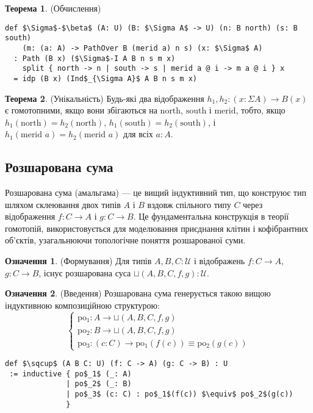 \documentclass{article}
\theoremstyle{definition}
\newtheorem{theorem}{Теорема}
\newtheorem{definition}{Означення}
\begin{document}
\begin{theorem} (Обчислення)
\begin{lstlisting}[mathescape=true]
def $\Sigma$-$\beta$ (A: U) (B: $\Sigma A$ -> U) (n: B north) (s: B south)
    (m: (a: A) -> PathOver B (merid a) n s) (x: $\Sigma$ A)
  : Path (B x) ($\Sigma$-I A B n s m x)
    split { north -> n | south -> s | merid a @ i -> m a @ i } x
  = idp (B x) (Ind$_{\Sigma A}$ A B n s m x)
\end{lstlisting}
\end{theorem}

\begin{theorem} (Унікальність)
Будь-які два відображення \( h_1, h_2 : (x : \Sigma A) \to B(x) \) є гомотопними, якщо вони збігаються
на \( \text{north} \), \( \text{south} \) і \( \text{merid} \), тобто,
якщо \( h_1(\text{north}) = h_2(\text{north}) \), \( h_1(\text{south}) = h_2(\text{south}) \),
і \( h_1(\text{merid } a) = h_2(\text{merid } a) \) для всіх \( a : A \).
\end{theorem}

\subsection{Розшарована сума}
Розшарована сума (амальгама) — це вищий індуктивний тип, що конструює тип шляхом
склеювання двох типів \( A \) і \( B \) вздовж спільного типу \( C \) через відображення \( f : C \to A \)
і \( g : C \to B \). Це фундаментальна конструкція в теорії гомотопій,
використовується для моделювання приєднання клітин і кофібрантних об’єктів, узагальнюючи
топологічне поняття розшарованої суми.

\begin{definition} (Формування)
Для типів \( A, B, C : \mathcal{U} \) і відображень \( f : C \to A \), \( g : C \to B \),
існує розшарована суса \( \sqcup(A,B,C,f,g) : \mathcal{U} \).
\end{definition}

\begin{definition} (Введення)
Розшарована сума генерується такою вищою індуктивною композиційною структурою:
\[
\begin{cases}
\text{po$_1$} : A \to \sqcup(A,B,C,f,g) \\
\text{po$_2$} : B \to \sqcup(A,B,C,f,g) \\
\text{po$_3$} : (c : C) \to \text{po$_1$}(f(c)) \equiv \text{po$_2$}(g(c))
\end{cases}
\]
\begin{lstlisting}[mathescape=true]
def $\sqcup$ (A B C: U) (f: C -> A) (g: C -> B) : U
 := inductive { po$_1$ (_: A)
              | po$_2$ (_: B)
              | po$_3$ (c: C) : po$_1$(f(c)) $\equiv$ po$_2$(g(c))
              }
\end{lstlisting}
\end{definition}
\end{document}
